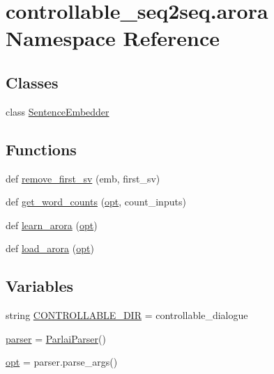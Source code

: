 \hypertarget{namespacecontrollable__seq2seq_1_1arora}{}\section{controllable\+\_\+seq2seq.\+arora Namespace Reference}
\label{namespacecontrollable__seq2seq_1_1arora}
\subsection*{Classes}
\begin{DoxyCompactItemize}
\item 
class \hyperlink{classcontrollable__seq2seq_1_1arora_1_1SentenceEmbedder}{Sentence\+Embedder}
\end{DoxyCompactItemize}
\subsection*{Functions}
\begin{DoxyCompactItemize}
\item 
def \hyperlink{namespacecontrollable__seq2seq_1_1arora_a8bbb1ed9f1b86ebe8378d07931f3040d}{remove\+\_\+first\+\_\+sv} (emb, first\+\_\+sv)
\item 
def \hyperlink{namespacecontrollable__seq2seq_1_1arora_aa75b304fb4087b1a9134d05f4bb6b3a7}{get\+\_\+word\+\_\+counts} (\hyperlink{namespacecontrollable__seq2seq_1_1arora_a79ced5bd43a82ae17d7e9513e9291781}{opt}, count\+\_\+inputs)
\item 
def \hyperlink{namespacecontrollable__seq2seq_1_1arora_a02fe047a44dcee074e6157300bd61001}{learn\+\_\+arora} (\hyperlink{namespacecontrollable__seq2seq_1_1arora_a79ced5bd43a82ae17d7e9513e9291781}{opt})
\item 
def \hyperlink{namespacecontrollable__seq2seq_1_1arora_a576d45e4f9888847ff61af471423f47d}{load\+\_\+arora} (\hyperlink{namespacecontrollable__seq2seq_1_1arora_a79ced5bd43a82ae17d7e9513e9291781}{opt})
\end{DoxyCompactItemize}
\subsection*{Variables}
\begin{DoxyCompactItemize}
\item 
string \hyperlink{namespacecontrollable__seq2seq_1_1arora_a4ef18f50c7c948c2084d4284ed62eb0a}{C\+O\+N\+T\+R\+O\+L\+L\+A\+B\+L\+E\+\_\+\+D\+IR} = \textquotesingle{}controllable\+\_\+dialogue\textquotesingle{}
\item 
\hyperlink{namespacecontrollable__seq2seq_1_1arora_a0940ac1dead7a4c7c7ad297f73305bc6}{parser} = \hyperlink{classparlai_1_1core_1_1params_1_1ParlaiParser}{Parlai\+Parser}()
\item 
\hyperlink{namespacecontrollable__seq2seq_1_1arora_a79ced5bd43a82ae17d7e9513e9291781}{opt} = parser.\+parse\+\_\+args()
\end{DoxyCompactItemize}


